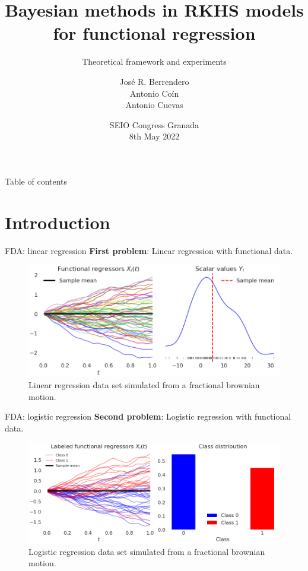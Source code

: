 \documentclass[10pt, english, professionalfonts]{beamer}
\title{Bayesian methods in RKHS models for functional regression}
\subtitle{Theoretical framework and experiments}
\date{SEIO Congress Granada\\ 8th May 2022\\}
\author{José R. Berrendero \\ Antonio Coín  \\ Antonio Cuevas\\}
\institute{Universidad Autónoma de Madrid \\ \textit{Departamento de Matemáticas}}
\newcommand\maroon[1]{\color{mLightBrown}#1\color{mDarkTeal}}
\begin{document}
\maketitle

\begin{frame}{Table of contents}
  \tableofcontents
\end{frame}

\section{Introduction}

\begin{frame}{FDA: linear regression}
  \textbf{First problem}: \maroon{Linear } regression with functional data.
  \vspace{1em}

\begin{figure}
    \includegraphics[width=\textwidth]{img/data_lin}
    \caption{Linear regression data set simulated from a fractional brownian motion.}
  \end{figure}
  \vspace{-1em}
\end{frame}
\begin{frame}{FDA: logistic regression}
  \textbf{Second problem}: \maroon{Logistic } regression with functional data.
\vspace{1em}

\begin{figure}
    \includegraphics[width=\textwidth]{img/data_log}
    \caption{Logistic regression data set simulated from a fractional brownian motion.}
  \end{figure}
  \vspace{-1em}
\end{frame}
\end{document}
